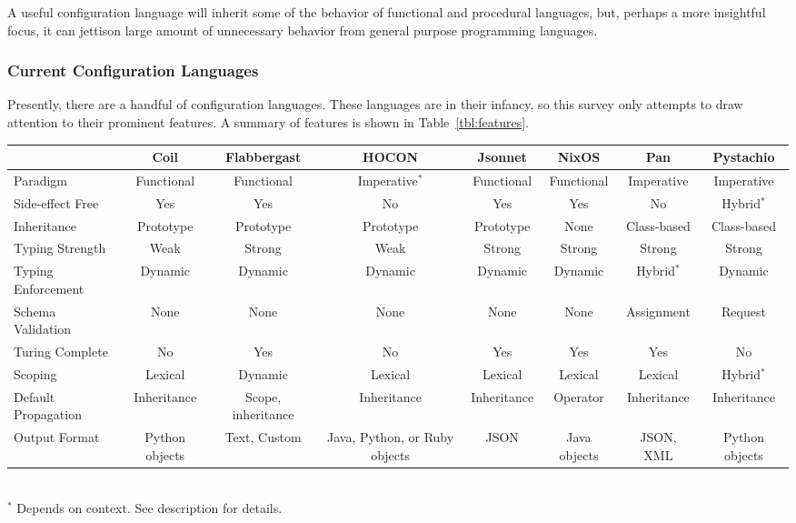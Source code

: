 \documentclass[letterpaper,twocolumn,10pt]{article}
\begin{document}
A useful configuration language will inherit some of the behavior of functional and procedural languages, but, perhaps a more insightful focus, it can jettison large amount of unnecessary behavior from general purpose programming languages.

\subsubsection{Current Configuration Languages}
Presently, there are a handful of configuration languages. These languages are in their infancy, so this survey only attempts to draw attention to their prominent features. A summary of features is shown in Table~\ref{tbl:features}.

\begin{table*}
\caption{\label{tbl:features}Comparison of configuration languages}
\scriptsize
\begin{tabular}{lccccccc}
\hline
										& Coil						& Flabbergast					& HOCON					& Jsonnet			& NixOS				& Pan & Pystachio \\\hline
Paradigm						& Functional			& Functional					& Imperative$^*$&	Functional	& Functional	& Imperative			& Imperative \\
Side-effect Free		& Yes							& Yes									& No						&	Yes					& Yes					& No							& Hybrid$^*$ \\
Inheritance					& Prototype				& Prototype						& Prototype			&	Prototype		& None				& Class-based			& Class-based \\
Typing Strength			& Weak						& Strong							& Weak					&	Strong			& Strong			& Strong					& Strong \\
Typing Enforcement	& Dynamic					& Dynamic							&	Dynamic				&	Dynamic			& Dynamic			& Hybrid$^*$			& Dynamic \\
Schema Validation		& None						& None								& None					& None				& None				& Assignment			& Request \\
Turing Complete			& No							& Yes									& No						& Yes					& Yes					& Yes							& No \\
Scoping							& Lexical					& Dynamic							& Lexical				& Lexical			& Lexical			& Lexical					& Hybrid$^*$ \\
Default Propagation	& Inheritance			&	Scope, inheritance	& Inheritance		& Inheritance	& Operator		& Inheritance			& Inheritance \\
Output Format				& Python objects	&	Text, Custom				& Java, Python, or Ruby objects		& JSON				& Java objects			& JSON, XML				& Python objects \\
\hline
\end{tabular}\\
$^*$ Depends on context. See description for details.
\end{table*}
\end{document}
